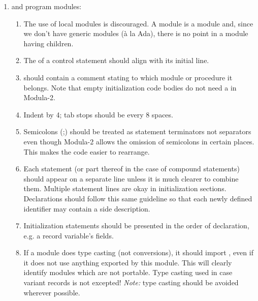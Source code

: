 \begin{enumerate}
\begin{enumerate}
    \end{enumerate}

\item
     and program modules:
    \begin{enumerate}
    \item
        The use of local modules is discouraged.  A module is a module 
	and, since we
        don't have generic modules (\`{a} la Ada), there is no point in a module
        having children.  

    \item
        The  of a control statement should align with its initial line.

    \item 
         should contain a comment stating to which module or 
	procedure
        it belongs.  Note that empty initialization code bodies do not need
        a  in Modula-2.
    \item
        Indent by 4; tab stops should be every 8 spaces.

    \item
        Semicolons (;) should be treated as statement terminators not 
	separators even though Modula-2 allows the omission of semicolons
	in certain places.  This makes the code easier to rearrange.

    \item 
        Each statement (or part thereof in the case of
        compound statements) should appear on a separate line unless it
	is much clearer to combine them. 
        Multiple statement lines are okay in 
	initialization sections.
        Declarations should follow this same guideline so that
	each newly defined
        identifier may contain a side description.

    \item
        Initialization statements should be presented in the order of 
	declaration, e.g.
	a record variable's fields.

    \item 
        If a module does type casting (not conversions), it should import
        , even if it does not use anything 
	exported by this module.  
        This will clearly identify modules which are not portable.  
	Type casting used in case variant records is not excepted!
	{\em Note:} type casting should be avoided wherever possible.


\end{enumerate}
\end{enumerate}
